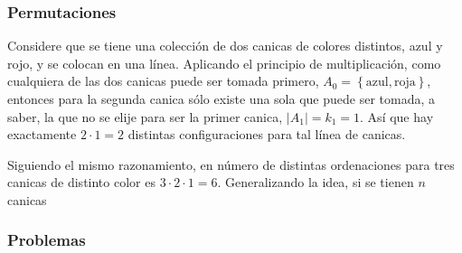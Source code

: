 \documentclass[spanish]{report}
\newcommand{\card}[1]{\left|#1 \right|}
\begin{document}
\subsubsection{Permutaciones}
Considere que se tiene una colección de dos canicas de colores distintos, azul y rojo, y se colocan en una línea.
Aplicando el principio de multiplicación, como cualquiera de las dos canicas puede ser tomada primero, $A_0 = \left\lbrace \text{azul}, \text{roja} \right\rbrace$, entonces para la segunda canica sólo existe una sola que puede ser tomada, a saber, la que no se elije para ser la primer canica, $\card{A_1} = k_1 = 1$. Así que hay exactamente $2 \cdotp 1 = 2$ distintas configuraciones para tal línea de canicas.

Siguiendo el mismo razonamiento, en número de distintas ordenaciones para tres canicas de distinto color es $3 \cdotp 2 \cdotp 1= 6$.
Generalizando la idea, si se tienen $n$ canicas 

\subsubsection{Problemas}
\end{document}

